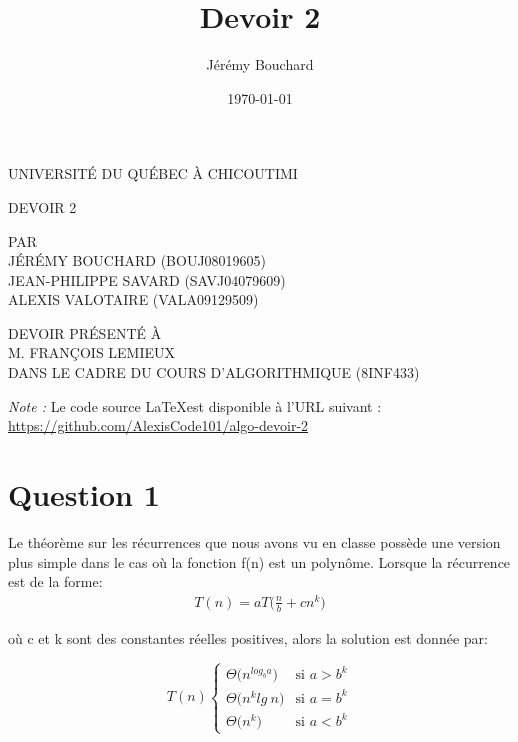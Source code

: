 \documentclass[12pt]{article}
\title{Devoir 2}
\author{Jérémy Bouchard}
\date{\today}
\begin{document}
\begin{titlepage}
	\doublespacing
	\centering
	
	UNIVERSITÉ DU QUÉBEC À CHICOUTIMI \\
	
	\vspace{4.7cm}
	
	DEVOIR 2 \\
	
	\vspace{4.7cm}
	
	PAR \\
	JÉRÉMY BOUCHARD (BOUJ08019605) \\
	JEAN-PHILIPPE SAVARD (SAVJ04079609) \\
	ALEXIS VALOTAIRE (VALA09129509) \\
	
	\vspace{4.7cm}
	
	DEVOIR PRÉSENTÉ À \\
	M. FRANÇOIS LEMIEUX \\
	DANS LE CADRE DU COURS D'ALGORITHMIQUE (8INF433)
\end{titlepage}

\newpage

\textit{Note :} Le code source \LaTeX \:est disponible à l'URL suivant : \\ 
\url{https://github.com/AlexisCode101/algo-devoir-2}

\newpage

\onehalfspacing

\section*{Question 1}
Le théorème sur les récurrences que nous avons vu en classe possède
une version plus simple dans le cas où la fonction f(n) est un polynôme.
Lorsque la récurrence est de la forme:
\begin{align*}
	T(n) = aT\Big(\frac{n}{b} + cn^k\Big)
\end{align*}

où c et k sont des constantes réelles positives, alors la solution est
donnée par:

\[T(n) \begin{cases} 
      \Theta\big(n^{log_ba}\big) & \text{si } a>b^k \\
      \Theta\big(n^klg \: n\big) & \text{si } a=b^k \\
      \Theta\big(n^k\big) & \text{si } a<b^k
   \end{cases}
\]	
\end{document}
